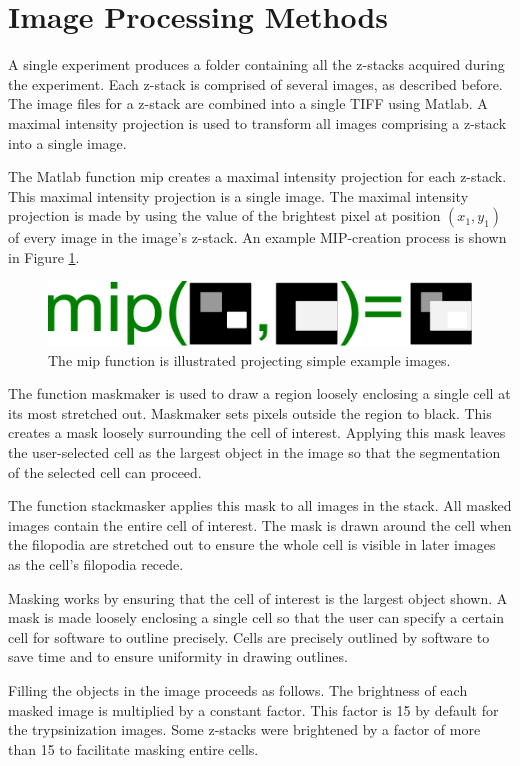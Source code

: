\documentclass[ twocolumn,notitlepage]{ revtex4-1}
\begin{document}
\section*{Image Processing Methods}
A single experiment produces a folder containing all the z-stacks acquired during the experiment. Each z-stack is comprised of several images, as described before. The image files for a z-stack are combined into a single TIFF using Matlab. A maximal intensity projection is used to transform all images comprising a z-stack into a single image.

The Matlab function mip creates a maximal intensity projection for each z-stack. This maximal intensity projection is a single image. The maximal intensity projection is made by using the value of the brightest pixel at position $(x_1,y_1)$ of every image in the image's z-stack. An example MIP-creation process is shown in Figure \ref{fig:mip-illustration}.

\begin{figure}[!h]
\includegraphics[width=.4\textwidth]{./img/mip-illustration.pdf}
\caption{The mip function is illustrated projecting simple example images.}
\label{fig:mip-illustration}
\end{figure}

The function maskmaker is used to draw a region loosely enclosing a single cell at its most stretched out. Maskmaker sets pixels outside the region to black. This creates a mask loosely surrounding the cell of interest. Applying this mask leaves the user-selected cell as the largest object in the image so that the segmentation of the selected cell can proceed. 

The function stackmasker applies this mask to all images in the stack. All masked images contain the entire cell of interest. The mask is drawn around the cell when the filopodia are stretched out to ensure the whole cell is visible in later images as the cell's filopodia recede.

Masking works by ensuring that the cell of interest is the largest object shown. A mask is made loosely enclosing a single cell so that the user can specify a certain cell for software to outline precisely. Cells are precisely outlined by software to save time and to ensure uniformity in drawing outlines.

Filling the objects in the image proceeds as follows. The brightness of each masked image is multiplied by a constant factor. This factor is 15 by default for the trypsinization images. Some z-stacks were brightened by a factor of more than 15 to facilitate masking entire cells.
\end{document}
